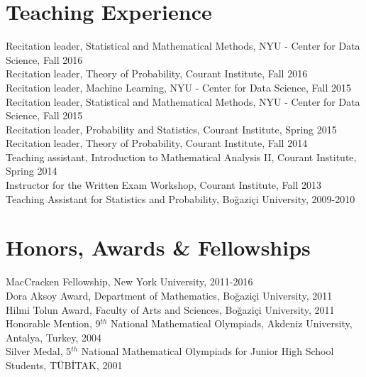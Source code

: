 \documentclass[10pt,letterpaper]{article}
\renewenvironment{itemize}
{
\begin{list}{}{\setlength{\leftmargin}{1.5em}}
}
{
  \end{list}
}
\begin{document}
\section*{Teaching Experience}
\begin{itemize}
\item Recitation leader, Statistical and Mathematical Methods, NYU - Center for Data Science, Fall 2016 \\ 
Recitation leader, Theory of Probability, Courant Institute, Fall 2016 \\ 
Recitation leader, Machine Learning, NYU - Center for Data Science, Fall 2015 \\ 
Recitation leader, Statistical and Mathematical Methods, NYU - Center for Data Science, Fall 2015 \\ 
Recitation leader, Probability and Statistics, Courant Institute, Spring 2015 \\ 
Recitation leader, Theory of Probability, Courant Institute, Fall 2014 \\ 
Teaching assistant, Introduction to Mathematical Analysis II, Courant Institute, Spring 2014 \\ 
Instructor for the Written Exam Workshop, Courant Institute, Fall 2013 \\ 
Teaching Assistant for Statistics and Probability, Bo\u{g}azi\c{c}i University, 2009-2010
\end{itemize}

\section*{Honors, Awards \& Fellowships}
\begin{itemize}
\item MacCracken Fellowship, New York University, 2011-2016 \\
Dora Aksoy Award, Department of Mathematics, Bo\u{g}azi\c{c}i University, 2011 \\ 
Hilmi Tolun Award, Faculty of Arts and Sciences, Bo\u{g}azi\c{c}i University, 2011 \\ 
Honorable Mention, 9$^{th}$ National Mathematical Olympiads, Akdeniz University, Antalya, Turkey, 2004 \\ 
Silver Medal, 5$^{th}$ National Mathematical Olympiads for Junior High School Students, T\"{U}B\.{I}TAK, 2001
\end{itemize}
\end{document}
